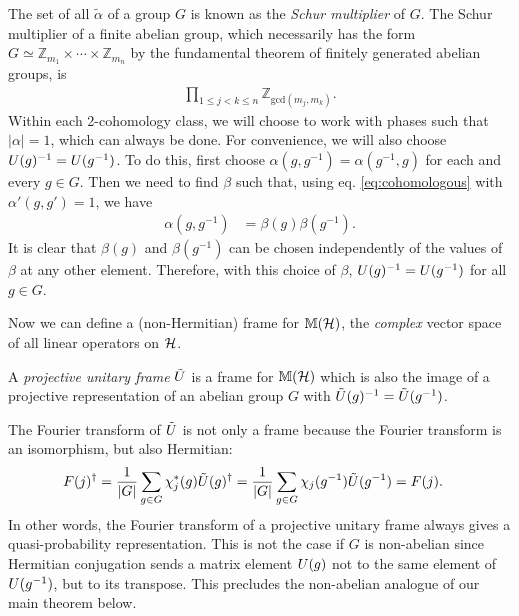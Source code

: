 The set of all $\tilde \alpha$ of a group $G$ is known as the \emph{Schur multiplier} of $G$. The Schur multiplier of a finite abelian group, which necessarily has the form $G \simeq \mathbb{Z}_{m_1}\times \cdots \times \mathbb{Z}_{m_n}$ by the fundamental theorem of finitely generated abelian groups,
is \cite[p.317]{Karpilovsky2}
\begin{align}\label{schur-multiplier}
	\prod_{1\le j<k\le n} \mathbb{Z}_{\text{gcd}(m_j,m_k)}.
\end{align}
Within each 2-cohomology class, we will choose to work with phases such that $|\alpha|=1$, which can always be done. For convenience, we will also choose $U(g)^{-1}=U(g^{-1})$. To do this, first choose $\alpha(g,g^{-1})=\alpha(g^{-1},g)$ for each and every $g \in G$. Then we need to find $\beta$ such that, using eq. \eqref{eq:cohomologous}
with $\alpha'(g,g')=1$, we have
\begin{align}
\alpha(g,g^{-1}) & =\beta(g)\beta(g^{-1}).
\end{align}
It is clear that $\beta(g)$ and $\beta(g^{-1})$ can be chosen independently of the values of $\beta$ at any other element. Therefore, with this choice of $\beta$, $U(g)^{-1} = U(g^{-1})$ for all $g \in G$.

Now we can define a (non-Hermitian) frame for $\mathbb{M}(\mathcal{H})$, the \emph{complex} vector space of all linear operators on $\mathcal{H}$.

\begin{definition}\label{def:projective-frame} A \emph{projective unitary frame} $\tilde{U}$ is a frame for $\mathbb{M}(\mathcal{H})$ which is also the image of a projective representation of an abelian group $G$ with $\tilde{U}(g)^{-1}=\tilde{U}(g^{-1})$.
\end{definition}

The Fourier transform of $\tilde{U}$ is not only a frame because the Fourier transform is an isomorphism, but also Hermitian:
\begin{align}
F(j)^{\dagger} & =\frac{1}{|G|}\sum_{g \in G}\chi_j^*(g) \tilde{U}(g)^{\dagger} = \frac{1}{|G|} \sum_{g \in G} \chi_{j}(g^{-1}) \tilde{U}(g^{-1}) = F(j).
\end{align}
In other words, the Fourier transform of a projective unitary frame always gives a quasi-probability representation. This is not the case if $G$ is non-abelian since Hermitian conjugation sends a matrix element $U(g)$ not to the same element of $U(g^{-1})$, but to its transpose. This precludes the non-abelian analogue of our main theorem below.

